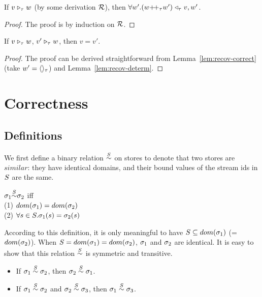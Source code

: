 \begin{lem} \label{lem:recov-correct}
	If $\ValRep{v}{\tau}{w}$ (by some derivation $\MR$), then $\forall w'.\Vtransb{(w {\++}_{\tau} w')}{\tau}{v}{w'}$. 
\end{lem}
\begin{proof}
	The proof is by induction on $\MR$. 
\end{proof}


\begin{cor}
	If $\ValRep{v}{\tau}{w}$, $\ValRep{v'}{\tau}{w}$,
	then $v=v'$.
\end{cor}
\begin{proof}
	The proof can be derived straightforward from Lemma~\ref{lem:recov-correct} (take $w' = \emptyvtau{\tau}$) and Lemma~\ref{lem:recov-determ}.
\end{proof}


\section{Correctness}

\subsection{Definitions}
We first define a binary relation $\~\S$ on stores to denote that two stores are $similar$: they have identical domains, and their bound values of the stream ids in $\S$ are the same. 


\begin{defi}
	\label{def-sgm-sim}
	
	$\sgm_1 {\~{\S}} \sgm_2 $
	iff \\
	(1) $dom(\sgm_1) = dom(\sgm_2)$ \\
	(2) $\forall s \in \S.\sgm_1(s)= \sgm_2(s)$ \\
\end{defi}

According to this definition, it is only meaningful to have $\S  \subseteq dom(\sgm_1)$ (= $dom(\sgm_2)$).  
When $\S = dom(\sgm_1) = dom(\sgm_2)$, $\sgm_1$ and $\sgm_2$ are identical. 
It is easy to show that this relation $\overset{\S}{\sim}$ is symmetric and transitive.
\begin{itemize}
	\item If $\sgm_1 \~\S \sgm_2$, then $\sgm_2 \~\S \sgm_1$.
	\item If $\sgm_1 \~\S \sgm_2$ and $\sgm_2 \~\S \sgm_3$, then $\sgm_1 \~\S \sgm_3$.
\end{itemize}


